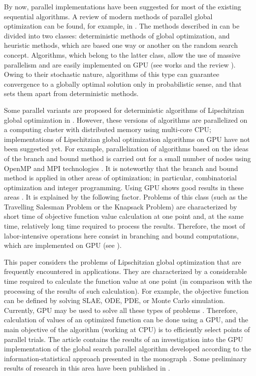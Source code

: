 \documentclass[smallcondensed]{svjour3}     %
\begin{document}
By now, parallel implementations have been suggested for most of the existing sequential algorithms. A review of modern methods of parallel global optimization can be found, for example, in \cite{RefApuzzo}. The methods described in \cite{RefApuzzo} can be divided into two classes: deterministic methods of global optimization, and heuristic methods, which are based one way or another on the random search concept. Algorithms, which belong to the latter class, allow the use of massive parallelism and are easily implemented on GPU (see works \cite{RefFerreiro,RefZhu,RefGarcia,RefMussi} and the review \cite{RefLangdon}). Owing to their stochastic nature, algorithms of this type can guarantee convergence to a globally optimal solution only in probabilistic sense, and that sets them apart from deterministic methods.

Some parallel variants are proposed for deterministic algorithms of Lipschitzian global optimization in \cite{RefGergel2005,RefEvtushenko,RefHe,RefPaulavicius}. However, these versions of algorithms are parallelized on a computing cluster with distributed memory using multi-core CPU; implementations of Lipschitzian global optimization algorithms on GPU have not been suggested yet. For example, parallelization of algorithms based on the ideas of the branch and bound method is carried out for a small number of nodes using OpenMP and MPI technologies \cite{RefPaulavicius}. It is noteworthy that the branch and bound method is applied in other areas of optimization; in particular, combinatorial optimization and integer programming. Using GPU shows good results in these areas \cite{RefBoukedjar,RefCarneiro}. It is explained by the following factor. Problems of this class (such as the Travelling Salesman Problem or the Knapsack Problem) are characterized by short time of objective function value calculation at one point and, at the same time, relatively long time required to process the results. Therefore, the most of labor-intensive operations here consist in branching and bound computations, which are implemented on GPU (see \cite{RefBoukedjar,RefCarneiro}).

This paper considers the problems of Lipschitzian global optimization that are frequently encountered in applications. They are characterized by a considerable time required to calculate the function value at one point (in comparison with the processing of the results of such calculation). For example, the objective function can be defined by solving SLAE, ODE, PDE, or Monte Carlo simulation. Currently, GPU may be used to solve all these types of problems \cite{RefKindratenko}. Therefore, calculation of values of an optimized function can be done using a GPU, and the main objective of the algorithm (working at CPU) is to efficiently select points of parallel trials. The article contains the results of an investigation into the GPU implementation of the global search parallel algorithm developed according to the information-statistical approach presented in the monograph \cite{RefStrongin2000}. Some preliminary results of research in this area have been published in \cite{RefLebedevBarkalov}.
\end{document}

